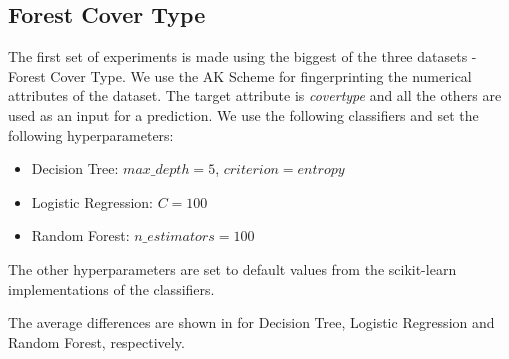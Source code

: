 \subsection{Forest Cover Type}
The first set of experiments is made using the biggest of the three datasets - Forest Cover Type. 
We use the AK Scheme for fingerprinting the numerical attributes of the dataset.
The target attribute is \textit{covertype} and all the others are used as an input for a prediction. 
We use the following classifiers and set the following hyperparameters:
    \begin{itemize}
        \item Decision Tree: $max\_depth=5$, $criterion=entropy$
        \item Logistic Regression: $C=100$
        \item Random Forest: $n\_estimators=100$
    \end{itemize}
    The other hyperparameters are set to default values from the scikit-learn implementations of the classifiers.

The average differences are shown in  for Decision Tree, Logistic Regression and Random Forest, respectively.

